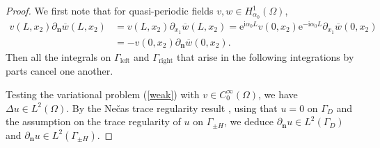\documentclass[a4paper,10pt]{article}
\newcommand{\bn}{{\mathbf n}}
\newcommand{\ri}{{\mathrm i}}
\newcommand{\re}{{\mathrm e}}
\newcommand{\dn}{{\partial_\bn}}
\newcommand{\dxo}{{\partial_{x_1}}}
\newcommand{\cw}{{\overline{w}}}
\newcommand{\GpmH}{{\Gamma_{\pm H}}}
\newcommand{\Gleft}{\Gamma_{\mathrm{left}}}
\newcommand{\Gright}{\Gamma_{\mathrm{right}}}
\begin{document}
\begin{proof}
We first note that for quasi-periodic fields $v,w\in H^1_{\alpha_0}(\Omega)$, 
\begin{align*}
	v(L,x_2){\dn\cw}(L,x_2)
	& =v(L,x_2){\dxo\cw}(L,x_2)
	=\re^{\ri \alpha_0 L} v(0,x_2) \re^{-\ri \alpha_0 L} {\dxo\cw}(0,x_2)\\
	&= -v(0,x_2){\dn\cw}(0,x_2).
\end{align*}
Then all the integrals on $\Gleft$ and $\Gright$ that arise in the following integrations by parts cancel one another.

Testing the variational problem (\ref{weak}) with $v\in C^\infty_0(\Omega)$, we have $\Delta u\in L^2(\Omega)$.	By the Ne\v cas trace regularity result \cite[Theorem~4.24]{MCL00}, using that $u=0$ on $\Gamma_D$ and the assumption on the trace regularity of $u$ on $\GpmH$, we deduce $\dn u\in L^2(\Gamma_D)$ and $\dn u\in L^2(\GpmH)$.


\end{proof}
\end{document}
